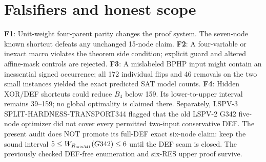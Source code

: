 \documentclass[11pt]{article}
\begin{document}
\section{Falsifiers and honest scope}
\noindent\textbf{F1}: Unit-weight four-parent parity changes the proof system. The seven-node known shortcut defeats any unchanged 15-node claim. \textbf{F2}: A four-variable or inexact macro violates the theorem side condition; explicit guard and altered affine-mask controls are rejected. \textbf{F3}: A mislabeled BPHP input might contain an inessential signed occurrence; all 172 individual flips and 46 removals on the two small instances yielded the exact predicted SAT model counts. \textbf{F4}: Hidden XOR/DEF shortcuts could reduce $B_4$ below 159. Its lower-to-upper interval remains 39--159; no global optimality is claimed there.
Separately, LSPV-3 SPLIT-HARDNESS-TRANSPORT344 flagged that the old LSPV-2 G342 five-node optimizer did not cover every permitted two-input conservative DEF. The present audit does NOT promote its full-DEF exact six-node claim: keep the sound interval $5\le W_{R_{\rm mix341}}(G342)\le6$ until the DEF seam is closed. The previously checked DEF-free enumeration and six-RES upper proof survive.
\end{document}
